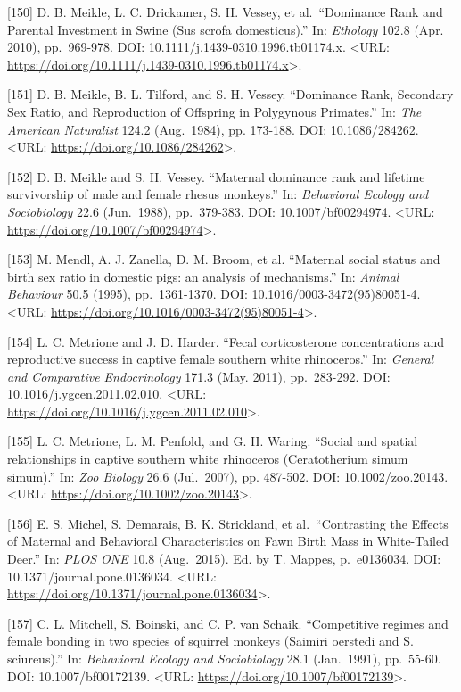 \documentclass[
]{article}
\begin{document}
{[}150{]} D. B. Meikle, L. C. Drickamer, S. H. Vessey, et
al.~``Dominance Rank and Parental Investment in Swine (Sus scrofa
domesticus).'' In: \emph{Ethology} 102.8 (Apr. 2010), pp.~969-978. DOI:
10.1111/j.1439-0310.1996.tb01174.x. \textless URL:
\url{https://doi.org/10.1111/j.1439-0310.1996.tb01174.x}\textgreater.

{[}151{]} D. B. Meikle, B. L. Tilford, and S. H. Vessey. ``Dominance
Rank, Secondary Sex Ratio, and Reproduction of Offspring in Polygynous
Primates.'' In: \emph{The American Naturalist} 124.2 (Aug.~1984), pp.
173-188. DOI: 10.1086/284262. \textless URL:
\url{https://doi.org/10.1086/284262}\textgreater.

{[}152{]} D. B. Meikle and S. H. Vessey. ``Maternal dominance rank and
lifetime survivorship of male and female rhesus monkeys.'' In:
\emph{Behavioral Ecology and Sociobiology} 22.6 (Jun.~1988),
pp.~379-383. DOI: 10.1007/bf00294974. \textless URL:
\url{https://doi.org/10.1007/bf00294974}\textgreater.

{[}153{]} M. Mendl, A. J. Zanella, D. M. Broom, et al. ``Maternal social
status and birth sex ratio in domestic pigs: an analysis of
mechanisms.'' In: \emph{Animal Behaviour} 50.5 (1995), pp.~1361-1370.
DOI: 10.1016/0003-3472(95)80051-4. \textless URL:
\url{https://doi.org/10.1016/0003-3472(95)80051-4}\textgreater.

{[}154{]} L. C. Metrione and J. D. Harder. ``Fecal corticosterone
concentrations and reproductive success in captive female southern white
rhinoceros.'' In: \emph{General and Comparative Endocrinology} 171.3
(May. 2011), pp.~283-292. DOI: 10.1016/j.ygcen.2011.02.010.
\textless URL:
\url{https://doi.org/10.1016/j.ygcen.2011.02.010}\textgreater.

{[}155{]} L. C. Metrione, L. M. Penfold, and G. H. Waring. ``Social and
spatial relationships in captive southern white rhinoceros
(Ceratotherium simum simum).'' In: \emph{Zoo Biology} 26.6 (Jul.~2007),
pp. 487-502. DOI: 10.1002/zoo.20143. \textless URL:
\url{https://doi.org/10.1002/zoo.20143}\textgreater.

{[}156{]} E. S. Michel, S. Demarais, B. K. Strickland, et
al.~``Contrasting the Effects of Maternal and Behavioral Characteristics
on Fawn Birth Mass in White-Tailed Deer.'' In: \emph{PLOS ONE} 10.8
(Aug.~2015). Ed. by T. Mappes, p.~e0136034. DOI:
10.1371/journal.pone.0136034. \textless URL:
\url{https://doi.org/10.1371/journal.pone.0136034}\textgreater.

{[}157{]} C. L. Mitchell, S. Boinski, and C. P. van Schaik.
``Competitive regimes and female bonding in two species of squirrel
monkeys (Saimiri oerstedi and S. sciureus).'' In: \emph{Behavioral
Ecology and Sociobiology} 28.1 (Jan.~1991), pp.~55-60. DOI:
10.1007/bf00172139. \textless URL:
\url{https://doi.org/10.1007/bf00172139}\textgreater.
\end{document}
